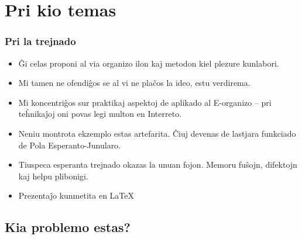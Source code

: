  
\section{Pri kio temas}


  \begin{frame}
    \frametitle{Pri la trejnado}

	
	\begin{itemize}

		\item Ĝi celas proponi al via organizo ilon kaj metodon kiel plezure kunlabori.
		
		\item Mi tamen ne ofendiĝos se al vi ne plaĉos la ideo, estu verdirema.
	
		\item Mi koncentriĝos sur praktikaj aspektoj de aplikado al E-organizo -- pri teĥnikaĵoj oni povas legi multon en Interreto.
	
		\item Neniu montrota ekzemplo estas artefarita. Ĉiuj devenas de lastjara funkciado de Pola Esperanto-Junularo.
		
		\item Tiuspeca esperanta trejnado okazas la unuan fojon. Memoru fuŝojn, difektojn kaj helpu plibonigi.
				
		\item Prezentaĵo kunmetita en \LaTeX
				
	\end{itemize}
  \end{frame}



\subsection{Kia problemo estas?}

